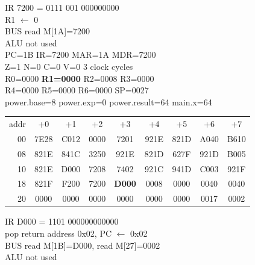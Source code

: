 \noindent\begin{tcolorbox}[stepbox, title={Step 40 \hfill PC 1A \quad LI R1, 0}]
\textcolor{dim}{IR} 7200 = 0111 001 000000000\\
R1 $\leftarrow$ 0\\
\textcolor{dim}{BUS} read M[1A]=7200\\
\textcolor{dim}{ALU} \textcolor{dim}{not used}\\
PC=1B IR=7200 MAR=1A MDR=7200\\
Z=1 N=0 C=0 V=0 \hfill \textcolor{dim}{3 clock cycles}\\
R0=0000 \textcolor{wrt}{\textbf{R1=0000}} R2=0008 R3=0000\\
R4=0000 R5=0000 R6=0000 SP=0027\\
\textcolor{dim}{power.base=8  power.exp=0  power.result=64  main.x=64}\\[1pt]
{\setlength{\tabcolsep}{1.6pt}\begin{tabular}{@{}r*{8}{c}@{}}
\textcolor{dim}{addr} & \textcolor{dim}{+0} & \textcolor{dim}{+1} & \textcolor{dim}{+2} & \textcolor{dim}{+3} & \textcolor{dim}{+4} & \textcolor{dim}{+5} & \textcolor{dim}{+6} & \textcolor{dim}{+7}\\
\textcolor{dim}{00} & 7E28 & C012 & 0000 & 7201 & 921E & 821D & A040 & B610\\
\textcolor{dim}{08} & 821E & 841C & 3250 & 921E & 821D & 627F & 921D & B005\\
\textcolor{dim}{10} & 821E & D000 & 7208 & 7402 & 921C & 941D & C003 & 921F\\
\textcolor{dim}{18} & 821F & F200 & 7200 & \cellcolor{pcc}\textbf{D000} & \cellcolor{datac}0008 & \cellcolor{datac}0000 & \cellcolor{datac}0040 & \cellcolor{datac}0040\\
\textcolor{dim}{20} & \cellcolor{stackc}0000 & \cellcolor{stackc}0000 & \cellcolor{stackc}0000 & \cellcolor{stackc}0000 & \cellcolor{stackc}0000 & \cellcolor{stackc}0000 & \cellcolor{stackc}0017 & \cellcolor{stackc}0002\\
\end{tabular}}
\end{tcolorbox}\hfill\begin{tcolorbox}[stepbox, title={Step 41 \hfill PC 1B \quad RET}]
\textcolor{dim}{IR} D000 = 1101 000000000000\\
pop return address 0x02, PC $\leftarrow$ 0x02\\
\textcolor{dim}{BUS} read M[1B]=D000, read M[27]=0002\\
\textcolor{dim}{ALU} \textcolor{dim}{not used}\\

\end{tcolorbox}
